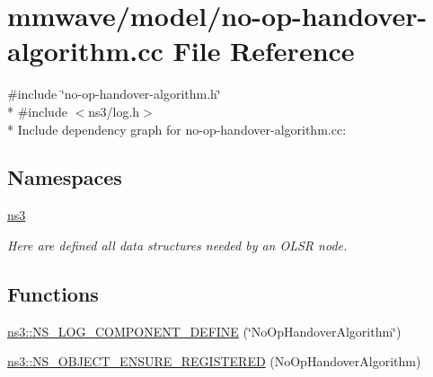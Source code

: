 \hypertarget{mmwave_2model_2no-op-handover-algorithm_8cc}{}\section{mmwave/model/no-\/op-\/handover-\/algorithm.cc File Reference}
\label{mmwave_2model_2no-op-handover-algorithm_8cc}
{\ttfamily \#include \char`\"{}no-\/op-\/handover-\/algorithm.\+h\char`\"{}}\\*
{\ttfamily \#include $<$ns3/log.\+h$>$}\\*
Include dependency graph for no-\/op-\/handover-\/algorithm.cc\+:
\subsection*{Namespaces}
\begin{DoxyCompactItemize}
\item 
 \hyperlink{namespacens3}{ns3}
\begin{DoxyCompactList}\small\item\em Here are defined all data structures needed by an O\+L\+SR node. \end{DoxyCompactList}\end{DoxyCompactItemize}
\subsection*{Functions}
\begin{DoxyCompactItemize}
\item 
\hyperlink{namespacens3_a6ffcef963a2374e79b41ecb9d46d1fdc}{ns3\+::\+N\+S\+\_\+\+L\+O\+G\+\_\+\+C\+O\+M\+P\+O\+N\+E\+N\+T\+\_\+\+D\+E\+F\+I\+NE} (\char`\"{}No\+Op\+Handover\+Algorithm\char`\"{})
\item 
\hyperlink{namespacens3_a941b18f35e40de73bbd6e33d24e19933}{ns3\+::\+N\+S\+\_\+\+O\+B\+J\+E\+C\+T\+\_\+\+E\+N\+S\+U\+R\+E\+\_\+\+R\+E\+G\+I\+S\+T\+E\+R\+ED} (No\+Op\+Handover\+Algorithm)
\end{DoxyCompactItemize}
